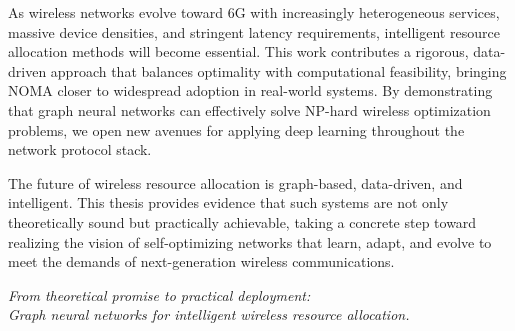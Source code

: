 As wireless networks evolve toward 6G with increasingly heterogeneous services, massive device densities, and stringent latency requirements, intelligent resource allocation methods will become essential. This work contributes a rigorous, data-driven approach that balances optimality with computational feasibility, bringing NOMA closer to widespread adoption in real-world systems. By demonstrating that graph neural networks can effectively solve NP-hard wireless optimization problems, we open new avenues for applying deep learning throughout the network protocol stack.

The future of wireless resource allocation is graph-based, data-driven, and intelligent. This thesis provides evidence that such systems are not only theoretically sound but practically achievable, taking a concrete step toward realizing the vision of self-optimizing networks that learn, adapt, and evolve to meet the demands of next-generation wireless communications.

\vspace{1cm}

\begin{center}
\textit{From theoretical promise to practical deployment:}\\
\textit{Graph neural networks for intelligent wireless resource allocation.}
\end{center}
